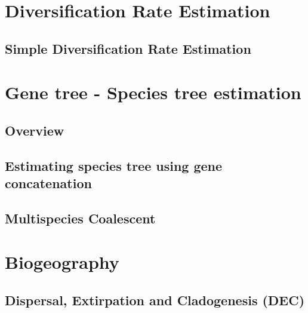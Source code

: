 \documentclass[11pt]{book}
\begin{document}
\part{Diversification Rate Estimation}
\chapter{Simple Diversification Rate Estimation}
\def \ResourcePath {RB_SimpleDiversification_Tutorial/}






\part{Gene tree - Species tree estimation}

\chapter{Overview}
\def \ResourcePath {RB_GTST_Tutorial/}


\chapter{Estimating species tree using gene concatenation}
\def \ResourcePath {RB_GeneConcatenation_Tutorial/}


\chapter{Multispecies Coalescent}
\def \ResourcePath {RB_MultispeciesCoalescent_Tutorial/}







\part{Biogeography}

\chapter{Dispersal, Extirpation and Cladogenesis (DEC)}
\def \ResourcePath {RB_Biogeography_DEC_Tutorial/}

\end{document}
